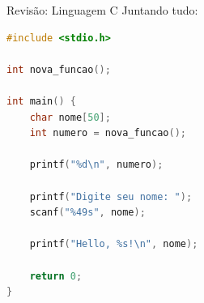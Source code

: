 \begin{frame}[fragile]{Revisão: Linguagem C}
    Juntando tudo:

\begin{lstlisting}[language=C,basicstyle=\ttfamily\scriptsize]
#include <stdio.h>

int nova_funcao();

int main() {
    char nome[50];
    int numero = nova_funcao();

    printf("%d\n", numero);

    printf("Digite seu nome: ");
    scanf("%49s", nome);

    printf("Hello, %s!\n", nome);

    return 0;
}
\end{lstlisting}

\end{frame}